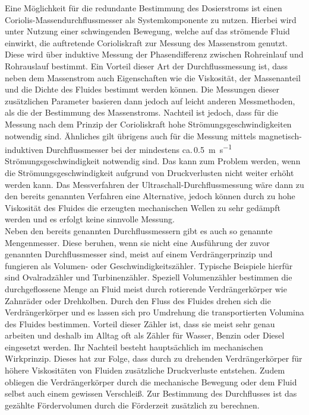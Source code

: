 Eine Möglichkeit für die redundante Bestimmung des Dosierstroms ist einen Coriolis-Massendurchflussmesser als Systemkomponente zu nutzen. Hierbei wird unter Nutzung einer schwingenden Bewegung, welche auf das strömende Fluid einwirkt, die auftretende Corioliskraft zur Messung des Massenstrom genutzt. Diese wird über induktive Messung der Phasendifferenz zwischen Rohreinlauf und Rohrauslauf bestimmt. Ein Vorteil dieser Art der Durchflussmessung ist, dass neben dem Massenstrom auch Eigenschaften wie die Viskosität, der Massenanteil und die Dichte des Fluides bestimmt werden können. Die Messungen dieser zusätzlichen Parameter basieren dann jedoch auf leicht anderen Messmethoden, als die der Bestimmung des Massenstroms. \cite{Ignatowitz.2015}\linebreak
Nachteil ist jedoch, dass für die Messung nach dem Prinzip der Corioliskraft hohe Strömungsgeschwindigkeiten notwendig sind. Ähnliches gilt übrigens auch für die Messung mittels magnetisch-induktiven Durchflussmesser bei der mindestens ca.\,\SI{0,5}{\meter \per \second} Strömungsgeschwindigkeit notwendig sind. Das kann zum Problem werden, wenn die Strömungsgeschwindigkeit aufgrund von Druckverlusten nicht weiter erhöht werden kann. Das Messverfahren der Ultraschall-Durchflussmessung wäre dann zu den bereits genannten Verfahren eine Alternative, jedoch können durch zu hohe Viskosität des Fluides die erzeugten mechanischen Wellen zu sehr gedämpft werden und es erfolgt keine sinnvolle Messung. \cite{D.Stepanek.Unbekannt, Wikipedia.2021,Wikipedia.2020}\\
Neben den bereits genannten Durchflussmessern gibt es auch so genannte Mengenmesser. Diese beruhen, wenn sie nicht eine Ausführung der zuvor genannten Durchflussmesser sind, meist auf einem Verdrängerprinzip und fungieren als Volumen- oder Geschwindigkeitszähler. Typische Beispiele hierfür sind Ovalradzähler und Turbinenzähler. Speziell Volumenzähler bestimmen die durchgeflossene Menge an Fluid meist durch rotierende Verdrängerkörper wie Zahnräder oder Drehkolben. Durch den Fluss des Fluides drehen sich die Verdrängerkörper und es lassen sich pro Umdrehung die transportierten Volumina des Fluides bestimmen. Vorteil dieser Zähler ist, dass sie meist sehr genau arbeiten und deshalb im Alltag oft als Zähler für Wasser, Benzin  oder Diesel eingesetzt werden. \cite{Ignatowitz.2015}\linebreak
Ihr Nachteil besteht hauptsächlich im mechanischen Wirkprinzip. Dieses hat zur Folge, dass durch zu drehenden Verdrängerkörper für höhere Viskositäten von Fluiden zusätzliche Druckverluste entstehen. Zudem obliegen die Verdrängerkörper durch die mechanische Bewegung oder dem Fluid selbst auch einem gewissen Verschleiß. Zur Bestimmung des Durchflusses ist das gezählte Fördervolumen durch die Förderzeit zusätzlich zu berechnen.\\
